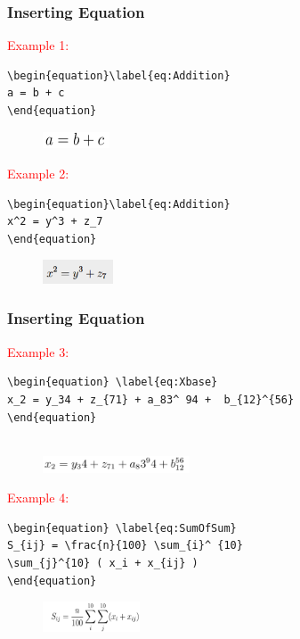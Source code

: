 \documentclass [9pt] {beamer}
\begin{document}
\begin{frame}[fragile]\frametitle{Inserting Equation}
\rm
\fontsize{9pt}{11pt}\selectfont
\textcolor{red}{Example 1:}
\begin{verbatim}
\begin{equation}\label{eq:Addition}
a = b + c
\end{equation}

\end{verbatim}
\begin{figure}
	\includegraphics[height=0.5cm]{eq1.png}
\end{figure}
\textcolor{red}{Example 2:}
\begin{verbatim}
\begin{equation}\label{eq:Addition}
x^2 = y^3 + z_7
\end{equation}

\end{verbatim}
\begin{figure}
	\includegraphics[height=0.7cm]{eq2.png}
\end{figure}
\end{frame}

\begin{frame}\frametitle{Inserting Equation}
\rm
\fontsize{9pt}{11pt}\selectfont
\textcolor{red}{Example 3:}
\begin{verbatim}
\begin{equation} \label{eq:Xbase}
x_2 = y_34 + z_{71} + a_83^ 94 +  b_{12}^{56}
\end{equation}


\end{verbatim}
\begin{figure}
\includegraphics[height=0.5cm]{eq3.png}
\end{figure}
\textcolor{red}{Example 4:}
\begin{verbatim}
\begin{equation} \label{eq:SumOfSum}
S_{ij} = \frac{n}{100} \sum_{i}^ {10}  
\sum_{j}^{10} ( x_i + x_{ij} )
\end{equation}

\end{verbatim}
\begin{figure}
\includegraphics[height=0.9cm]{eq4.png}
\end{figure}
\end{frame}
\end{document}
